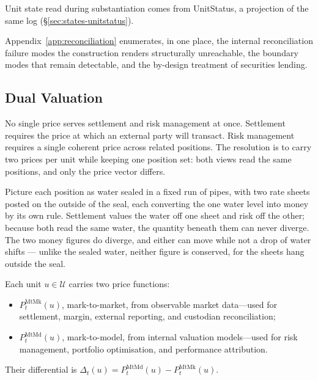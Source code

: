 Unit state read during substantiation comes from UnitStatus, a projection of the same log (\S\ref{sec:states-unitstatus}).

Appendix~\ref{app:reconciliation} enumerates, in one place, the internal reconciliation failure modes the construction renders structurally unreachable, the boundary modes that remain detectable, and the by-design treatment of securities lending.

\subsection{Dual Valuation}

No single price serves settlement and risk management at once. Settlement requires the price at which an external party will transact. Risk management requires a single coherent price across related positions. The resolution is to carry two prices per unit while keeping one position set: both views read the same positions, and only the price vector differs.

\begin{mentalmodel}
Picture each position as water sealed in a fixed run of pipes, with two rate sheets posted on the outside of the seal, each converting the one water level into money by its own rule. Settlement values the water off one sheet and risk off the other; because both read the same water, the quantity beneath them can never diverge. The two money figures do diverge, and either can move while not a drop of water shifts --- unlike the sealed water, neither figure is conserved, for the sheets hang outside the seal.
\end{mentalmodel}

\begin{definition}
Each unit $u\in\mathcal{U}$ carries two price functions:
\begin{itemize}[nosep]
\item $P_t^{\text{MtMk}}(u)$, mark-to-market, from observable market data---used for settlement, margin, external reporting, and custodian reconciliation;
\item $P_t^{\text{MtMd}}(u)$, mark-to-model, from internal valuation models---used for risk management, portfolio optimisation, and performance attribution.
\end{itemize}
Their differential is $\Delta_t(u)=P_t^{\text{MtMd}}(u)-P_t^{\text{MtMk}}(u)$.
\end{definition}

